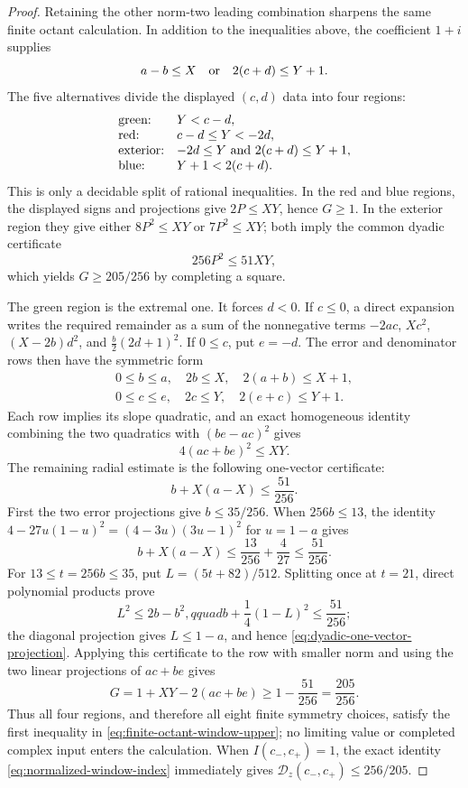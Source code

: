 \documentclass[11pt]{article}
\begin{document}
\begin{proof}
Retaining the other norm-two leading combination sharpens the same finite
octant calculation.  In addition to the inequalities above, the coefficient
$1+i$ supplies
\[
       a-b\le X\quad\hbox{or}\quad 2(c+d)\le Y+1.
\]
The five alternatives divide the displayed $(c,d)$ data into four regions:
\[
\begin{array}{ll}
 \text{green:}&Y<c-d,\\
 \text{red:}&c-d\le Y<-2d,\\
 \text{exterior:}&-2d\le Y\ \hbox{and}\ 2(c+d)\le Y+1,\\
 \text{blue:}&Y+1<2(c+d).
\end{array}
\]
This is only a decidable split of rational inequalities.  In the red and
blue regions, the displayed signs and projections give $2P\le XY$, hence
$G\ge1$.  In the exterior region they give either $8P^2\le XY$ or
$7P^2\le XY$; both imply the common dyadic certificate
\[
                         256P^2\le51XY,
\]
which yields $G\ge205/256$ by completing a square.

The green region is the extremal one.  It forces $d<0$.  If $c\le0$, a
direct expansion writes the required remainder as a sum of the nonnegative
terms $-2ac$, $Xc^2$, $(X-2b)d^2$, and
$\tfrac b2(2d+1)^2$.  If $0\le c$, put $e=-d$.  The error and denominator
rows then have the symmetric form
\[
\begin{gathered}
 0\le b\le a,\quad 2b\le X,\quad2(a+b)\le X+1,\\
 0\le c\le e,\quad 2c\le Y,\quad2(e+c)\le Y+1.
\end{gathered}
\]
Each row implies its slope quadratic, and an exact homogeneous identity
combining the two quadratics with $(be-ac)^2$ gives
\[
                         4(ac+be)^2\le XY.
\]
The remaining radial estimate is the following one-vector certificate:
\begin{equation}
\label{eq:dyadic-one-vector-projection}
 b+X(a-X)\le\frac{51}{256}.
\end{equation}
First the two error projections give $b\le35/256$.  When
$256b\le13$, the identity
$4-27u(1-u)^2=(4-3u)(3u-1)^2$ for $u=1-a$ gives
\[
 b+X(a-X)\le\frac{13}{256}+\frac4{27}\le\frac{51}{256}.
\]
For $13\le t=256b\le35$, put $L=(5t+82)/512$.  Splitting once at
$t=21$, direct polynomial products prove
\[
 L^2\le2b-b^2,qquad
 b+\frac14(1-L)^2\le\frac{51}{256};
\]
the diagonal projection gives $L\le1-a$, and hence
\eqref{eq:dyadic-one-vector-projection}.  Applying this certificate to the
row with smaller norm and using the two linear projections of $ac+be$ gives
\[
             G=1+XY-2(ac+be)\ge1-\frac{51}{256}
               =\frac{205}{256}.
\]
Thus all four regions, and therefore all eight finite symmetry choices,
satisfy the first inequality in
\eqref{eq:finite-octant-window-upper}; no limiting value or completed complex
input enters the calculation.  When $I(c_-,c_+)=1$, the exact identity
\eqref{eq:normalized-window-index} immediately gives
$\mathcal D_z(c_-,c_+)\le256/205$.


\end{proof}
\end{document}
